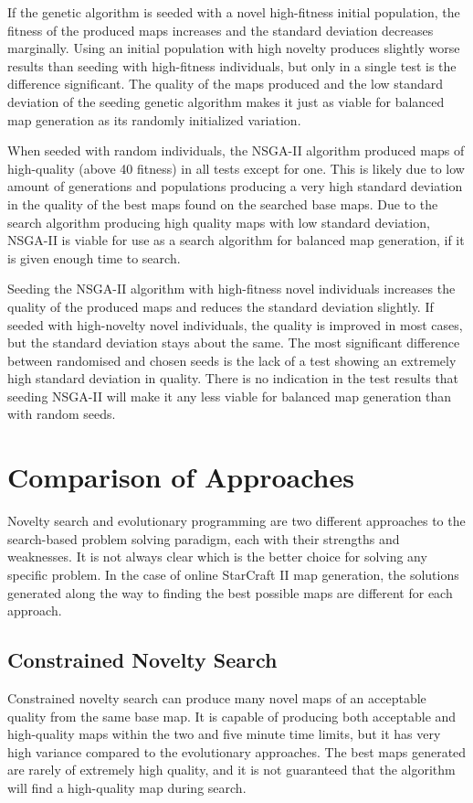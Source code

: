 If the genetic algorithm is seeded with a novel high-fitness initial population, the fitness of the produced maps increases and the standard deviation decreases marginally. Using an initial population with high novelty produces slightly worse results than seeding with high-fitness individuals, but only in a single test is the difference significant. The quality of the maps produced and the low standard deviation of the seeding genetic algorithm makes it just as viable for balanced map generation as its randomly initialized variation.

When seeded with random individuals, the NSGA-II algorithm produced maps of high-quality (above 40 fitness) in all tests except for one. This is likely due to low amount of generations and populations producing a very high standard deviation in the quality of the best maps found on the searched base maps. Due to the search algorithm producing high quality maps with low standard deviation, NSGA-II is viable for use as a search algorithm for balanced map generation, if it is given enough time to search.

Seeding the NSGA-II algorithm with high-fitness novel individuals increases the quality of the produced maps and reduces the standard deviation slightly. If seeded with high-novelty novel individuals, the quality is improved in most cases, but the standard deviation stays about the same. The most significant difference between randomised and chosen seeds is the lack of a test showing an extremely high standard deviation in quality. There is no indication in the test results that seeding NSGA-II will make it any less viable for balanced map generation than with random seeds. 

\section{Comparison of Approaches}
\label{discussion_comparison}
Novelty search and evolutionary programming are two different approaches to the search-based problem solving paradigm, each with their strengths and weaknesses. It is not always clear which is the better choice for solving any specific problem. In the case of online StarCraft II map generation, the solutions generated along the way to finding the best possible maps are different for each approach.

\subsection{Constrained Novelty Search}
\label{discussion_comparison_constrainednoveltysearch}
Constrained novelty search can produce many novel maps of an acceptable quality from the same base map. It is capable of producing both acceptable and high-quality maps within the two and five minute time limits, but it has very high variance compared to the evolutionary approaches. The best maps generated are rarely of extremely high quality, and it is not guaranteed that the algorithm will find a high-quality map during search.

